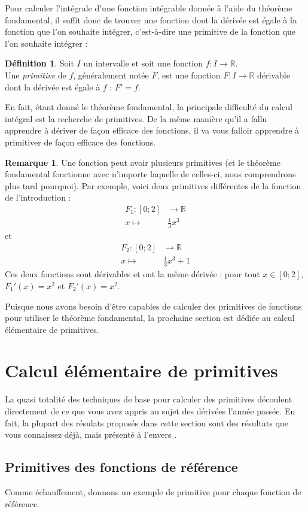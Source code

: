 \documentclass[a4paper,fontsize=13pt]{scrreprt}
\theoremstyle{plain}
\theoremstyle{definition}
\newtheorem{déf}[subsection]{Définition}
\newtheorem{rema}[subsection]{Remarque}
\newcommand{\rr}{\mathbb{R}}
\begin{document}
Pour calculer l'intégrale d'une fonction intégrable donnée à l'aide du théorème fondamental, il suffit donc de trouver une fonction dont la dérivée est égale à la fonction que l'on souhaite intégrer, c'est-à-dire une primitive de la fonction que l'on souhaite intégrer :
\begin{déf}
Soit $I$ un intervalle et soit une fonction $f : I \to \rr$. \\
Une \emph{primitive} de $f$, généralement notée $F$, est une fonction $F : I \to \rr$ dérivable dont la dérivée est égale à $f$ : $F' = f$.
\end{déf}
En fait, étant donné le théorème fondamental, la principale difficulté du calcul intégral est la recherche de primitives. De la même manière qu'il a fallu apprendre à dériver de façon efficace des fonctions, il va vous falloir apprendre à primitiver de façon efficace des fonctions.
\begin{rema}
Une fonction peut avoir plusieurs primitives (et le théorème fondamental fonctionne avec n'importe laquelle de celles-ci, nous comprendrons plus tard pourquoi). Par exemple, voici deux primitives différentes de la fonction de l'introduction :
\begin{align*}
F_1 : [0;2]& \to \rr \\
x \mapsto & \frac{1}{3}x^3
\end{align*}
et
\begin{align*}
F_2 : [0;2]& \to \rr \\
x \mapsto & \frac{1}{3}x^3+1
\end{align*}
Ces deux fonctions sont dérivables et ont la même dérivée : pour tout $x \in [0;2]$, $F_1 ' (x) = x^2$ et $F_2 ' (x) = x^2$.
\end{rema}
Puisque nous avons besoin d'être capables de calculer des primitives de fonctions pour utiliser le théorème fondamental, la prochaine section est dédiée au calcul élémentaire de primitives.

\chapter{Calcul élémentaire de primitives}

La quasi totalité des techniques de base pour calculer des primitives découlent directement de ce que vous avez appris au sujet des dérivées l'année passée. En fait, la plupart des résulats proposés dans cette section sont des résultats que vous connaissez déjà, mais présenté \og à l'envers \fg{}.

\section{Primitives des fonctions de référence}
Comme échauffement, donnons un exemple de primitive pour chaque fonction de référence.
\end{document}
